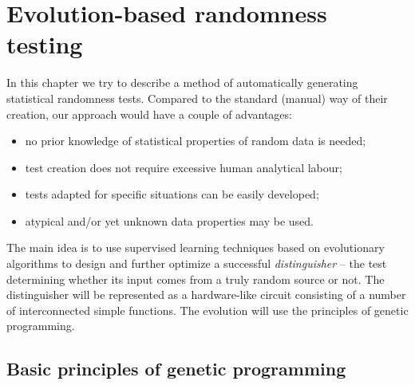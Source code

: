 \documentclass[12pt,oneside]{fithesis2}
\newcommand{\squarebullet}{\textcolor{black}{\raisebox{0.15em}{\rule{4pt}{4pt}}}}
\newenvironment{myItemize}{
  \begin{itemize}[leftmargin=2em,rightmargin=1em,itemsep=\parskip ,parsep=0em,topsep=0em,partopsep=0em]
  \renewcommand{\labelitemi}{\squarebullet}
  \renewcommand{\labelitemii}{$\diamond$}
}{
  \end{itemize}
}
\begin{document}
\chapter{Evolution-based randomness testing}
\label{chap:evo-based-testing}

In this chapter we try to describe a method of automatically generating statistical randomness tests. Compared to the standard
(manual) way of their creation, our approach would have a couple of advantages: 
\begin{myItemize}
\item no prior knowledge of statistical properties of random data is needed;
\item test creation does not require excessive human analytical labour;
\item tests adapted for specific situations can be easily developed;
\item atypical and/or yet unknown data properties may be used.
\end{myItemize}

\noindent
The main idea is to use supervised learning techniques based on evolutionary algorithms to design and further 
optimize a successful \textit{distinguisher} -- the test determining whether its input comes from a truly random source or not. 
The distinguisher will be represented as a hardware-like circuit consisting of a number of interconnected simple functions.
The evolution will use the principles of genetic programming.

\section{Basic principles of genetic programming}
\label{sec:basic-ga}
\end{document}
